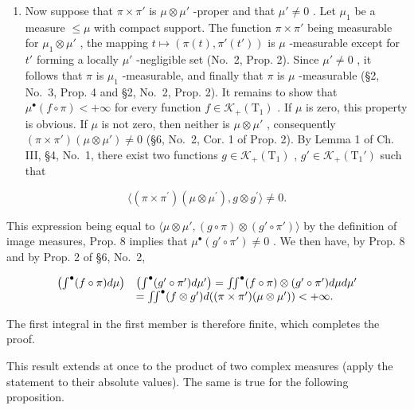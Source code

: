 \begin{enumerate}
\def\labelenumi{\alph{enumi})}
\setcounter{enumi}{1}
\tightlist
\item
  Now suppose that \(\pi \times \pi'\) is \(\mu \otimes \mu'\) -proper and that \(\mu' \neq 0\) . Let \(\mu_1\) be a measure \(\leqslant \mu\) with compact support. The function \(\pi \times \pi'\) being measurable for \(\mu_1 \otimes \mu'\) , the mapping \(t \mapsto (\pi(t), \pi'(t'))\) is \(\mu\) -measurable except for \(t'\) forming a locally \(\mu'\) -negligible set (No.~2, Prop. 2). Since \(\mu' \neq 0\) , it follows that \(\pi\) is \(\mu_1\) -measurable, and finally that \(\pi\) is \(\mu\) -measurable (§2, No.~3, Prop. 4 and §2, No.~2, Prop. 2). It remains to show that \(\mu^{\bullet}(f \circ \pi) < +\infty\) for every function \(f \in \mathcal{K}_{+}(\mathrm{T}_{1})\) . If \(\mu\) is zero, this property is obvious. If \(\mu\) is not zero, then neither is \(\mu \otimes \mu'\) , consequently \((\pi \times \pi') (\mu \otimes \mu') \neq 0\) (§6, No.~2, Cor. 1 of Prop. 2). By Lemma 1 of Ch. III, §4, No.~1, there exist two functions \(g \in \mathcal{K}_{+}(\mathrm{T}_{1})\) , \(g' \in \mathcal{K}_{+}(\mathrm{T}_{1}')\) such that
\end{enumerate}

\[
\langle (\pi \times \pi^ {\prime}) (\mu \otimes \mu^ {\prime}), g \otimes g ^ {\prime} \rangle \neq 0.
\]

This expression being equal to \(\langle\mu\otimes\mu',(g\circ\pi)\otimes(g'\circ\pi')\rangle\) by the definition of image measures, Prop. 8 implies that \(\mu^{\bullet}(g'\circ\pi')\neq0\) . We then have, by Prop. 8 and by Prop. 2 of §6, No.~2,

\[
\begin{array}{r l} \left(\int^ {\bullet} (f \circ \pi) d \mu\right) & \left(\int^ {\bullet} (g ^ {\prime} \circ \pi^ {\prime}) d \mu^ {\prime}\right) = \iint^ {\bullet} (f \circ \pi) \otimes (g ^ {\prime} \circ \pi^ {\prime}) d \mu d \mu^ {\prime} \\ & = \iint^ {\bullet} (f \otimes g ^ {\prime}) d ((\pi \times \pi^ {\prime}) (\mu \otimes \mu^ {\prime})) <   + \infty . \end{array}
\]

The first integral in the first member is therefore finite, which completes the proof.

This result extends at once to the product of two complex measures (apply the statement to their absolute values). The same is true for the following proposition.

